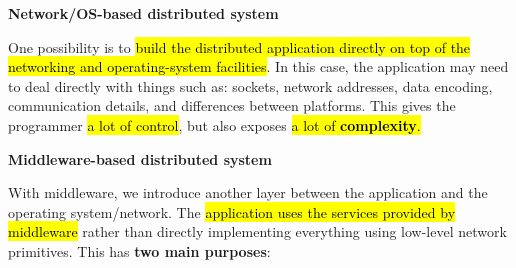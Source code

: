 \highspace
\begin{flushleft}
    \textcolor{Red2}{ \textbf{Network/OS-based distributed system}}
\end{flushleft}
One possibility is to \hl{build the distributed application directly on top of the networking and operating-system facilities}. In this case, the application may need to deal directly with things such as: sockets, network addresses, data encoding, communication details, and differences between platforms. This gives the programmer \hl{a lot of control}, but also exposes \hl{a lot of \textbf{complexity}.}

\highspace
\begin{flushleft}
    \textcolor{Green3}{ \textbf{Middleware-based distributed system}}
\end{flushleft}
With middleware, we introduce another layer between the application and the operating system/network. The \hl{application uses the services provided by middleware} rather than directly implementing everything using low-level network primitives. This has \textbf{two main purposes}:
